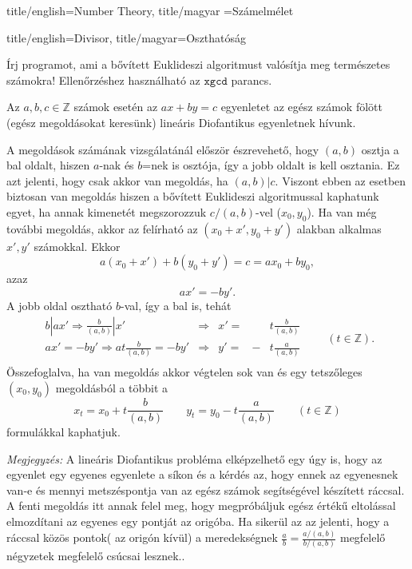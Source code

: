 \documentclass{amsbook}
\begin{document}
\begin{Part*}{
    title/english=Number Theory,
    title/magyar =Számelmélet}
\begin{Section}{
    title/english=Divisor,
    title/magyar=Oszthatóság}
  \begin{exercise} Írj programot, ami a bővített Euklideszi algoritmust
    valósítja meg természetes számokra! Ellen\H orzéshez használható az 
    $\mathtt{xgcd}$ parancs.
  \end{exercise}
  
  \begin{definition}
    Az $a,b,c\in\mathbb{Z}$ számok esetén az $ax+by=c$ egyenletet az egész
    számok fölött (egész megoldásokat keresünk) lineáris Diofantikus 
    egyenletnek hívunk.
  \end{definition}

  A megoldások számának vizsgálatánál először észrevehet\H o, hogy $(a,b)$
  osztja a bal oldalt, hiszen $a$-nak és $b$=nek is osztója, így a jobb oldalt
  is kell osztania. Ez azt jelenti, hogy csak akkor van megoldás, ha $(a,b)|c$.
  Viszont ebben az esetben biztosan van megoldás hiszen a b\H ovített
  Euklideszi algoritmussal kaphatunk  egyet, ha annak kimenetét megszorozzuk
  $c/(a,b)$-vel ($x_0, y_0$). Ha van még további megoldás, akkor az felírható
  az $(x_0 + x', y_0 + y')$ alakban alkalmas $x',y'$ számokkal. Ekkor \[
    a(x_0+x')+b(y_0+y') = c = ax_0 + by_0,\] azaz \[ ax' = -by'. \]
  A jobb oldal osztható $b$-val, így a bal is, tehát \[
    \begin{array}{lclrl}
      \displaystyle b|ax' \Rightarrow \frac{b}{(a,b)}|x' & \Rightarrow &  
      x'= & &  \displaystyle t\frac{b}{(a,b)} \\
      \displaystyle ax' = -by' \Rightarrow at\frac{b}{(a,b)} = -by' & \Rightarrow &
      y'= & - & \displaystyle t\frac{a}{(a,b)}\\
    \end{array}\qquad (t\in\mathbb{Z}).\]
  Összefoglalva, ha van megoldás akkor végtelen sok van és egy tetsz\H oleges
  $(x_0, y_0)$ megoldásból a többit a 
  \[
    x_t = x_0 + t\frac{b}{(a,b)}\qquad y_t= y_0-t\frac{a}{(a,b)}\qquad(t\in\mathbb{Z})\]
  formulákkal kaphatjuk.

  \emph{Megjegyzés:} A lineáris Diofantikus probléma elképzelhet\H o egy úgy
  is, hogy az egyenlet egy egyenes egyenlete a síkon és a kérdés az, hogy
  ennek az egyenesnek van-e és mennyi metszéspontja van az egész számok segítségével
  készített ráccsal. A fenti megoldás itt annak felel meg, hogy megpróbáljuk 
  egész érték\H u eltolással elmozdítani az egyenes egy pontját az origóba. Ha
  sikerül az az jelenti, hogy a ráccsal közös pontok( az origón kívül) a
  meredekségnek $\frac{a}{b}=\frac{a/(a,b)}{b/(a,b)}$ megfelel\H o négyzetek 
  megfelel\H o csúcsai lesznek..


\end{Section}
\end{Part*}
\end{document}
